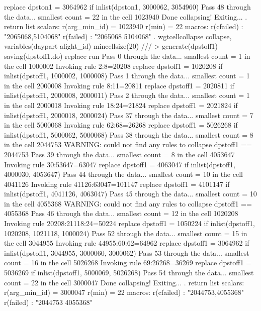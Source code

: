   replace dpston1 = 3064962 if inlist(dpston1, 3000062, 3054960)
Pass 48 through the data...
  smallest count = 22 in the cell      1023940
  Done collapsing! Exiting...
{\smallskip}
. return list
{\smallskip}
scalars:
         r(arg_min_id) =  1023940
                r(min) =  22
{\smallskip}
macros:
            r(cfailed) : "2065068,5104068"
             r(failed) : "2065068 5104068"
{\smallskip}
. wgtcellcollapse collapse, variables(daypart alight_id) mincellsize(20) ///
>         generate(dpstoff1) saving(dpstoff1.do) replace run
Pass 0 through the data...
  smallest count = 1 in the cell      1000002
  Invoking rule 2:8=20208
  replace dpstoff1 = 1020208 if inlist(dpstoff1, 1000002, 1000008)
Pass 1 through the data...
  smallest count = 1 in the cell      2000008
  Invoking rule 8:11=20811
  replace dpstoff1 = 2020811 if inlist(dpstoff1, 2000008, 2000011)
Pass 2 through the data...
  smallest count = 1 in the cell      2000018
  Invoking rule 18:24=21824
  replace dpstoff1 = 2021824 if inlist(dpstoff1, 2000018, 2000024)
\smallskip
\oom
\smallskip
Pass 37 through the data...
  smallest count = 7 in the cell      5000068
  Invoking rule 62:68=26268
  replace dpstoff1 = 5026268 if inlist(dpstoff1, 5000062, 5000068)
Pass 38 through the data...
  smallest count = 8 in the cell      2044753
  WARNING: could not find any rules to collapse dpstoff1 == 2044753
Pass 39 through the data...
  smallest count = 8 in the cell      4053647
  Invoking rule 30:53647=63047
  replace dpstoff1 = 4063047 if inlist(dpstoff1, 4000030, 4053647)
\smallskip
\oom
\smallskip
Pass 44 through the data...
  smallest count = 10 in the cell      4041126
  Invoking rule 41126:63047=101147
  replace dpstoff1 = 4101147 if inlist(dpstoff1, 4041126, 4063047)
Pass 45 through the data...
  smallest count = 10 in the cell      4055368
  WARNING: could not find any rules to collapse dpstoff1 == 4055368
Pass 46 through the data...
  smallest count = 12 in the cell      1020208
  Invoking rule 20208:21118:24=50224
  replace dpstoff1 = 1050224 if inlist(dpstoff1, 1020208, 1021118, 1000024)
\smallskip
\oom
\smallskip
Pass 52 through the data...
  smallest count = 15 in the cell      3044955
  Invoking rule 44955:60:62=64962
  replace dpstoff1 = 3064962 if inlist(dpstoff1, 3044955, 3000060, 3000062)
Pass 53 through the data...
  smallest count = 16 in the cell      5026268
  Invoking rule 69:26268=36269
  replace dpstoff1 = 5036269 if inlist(dpstoff1, 5000069, 5026268)
Pass 54 through the data...
  smallest count = 22 in the cell      3000047
  Done collapsing! Exiting...
{\smallskip}
. return list
{\smallskip}
scalars:
         r(arg_min_id) =  3000047
                r(min) =  22
{\smallskip}
macros:
            r(cfailed) : "2044753,4055368"
             r(failed) : "2044753 4055368"

